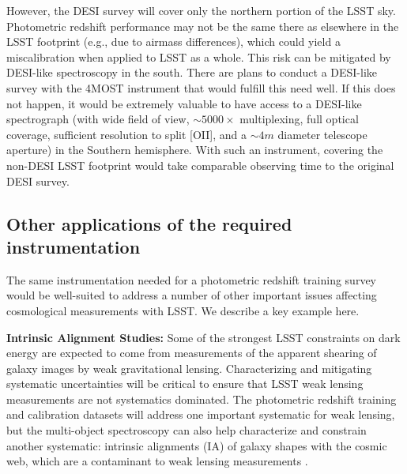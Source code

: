 However, the DESI survey will cover only the northern portion of the LSST sky.  Photometric redshift performance may not be the same there as elsewhere in the LSST footprint (e.g., due to airmass differences), which could yield a miscalibration when applied to LSST as a whole.  This risk can be mitigated by DESI-like spectroscopy in the south.  There are plans to conduct a DESI-like survey with the 4MOST instrument that would fulfill this need well.  If this does not happen, it would be extremely valuable to have access to a DESI-like spectrograph (with wide field of view, $\sim 5000\times$ multiplexing, full optical coverage, sufficient resolution to split [OII], and a $\sim 4m$ diameter telescope aperture) in the Southern hemisphere.  With such an instrument, covering the non-DESI LSST footprint would take comparable observing time to the original DESI survey.

\subsection{Other applications of the required instrumentation}

The same instrumentation needed for a photometric redshift training survey would be well-suited to address a number of other important issues  affecting cosmological measurements with LSST.  We describe a key example here.

{\bf Intrinsic Alignment Studies:} Some of the strongest LSST constraints on dark energy are
expected to come from measurements of the apparent shearing of galaxy images by weak gravitational
lensing.  Characterizing and mitigating systematic uncertainties will be critical to ensure that
LSST weak lensing measurements are not systematics dominated.  The photometric redshift training and
calibration datasets will address one important systematic for weak lensing, but the multi-object
spectroscopy can also help characterize and constrain another systematic: intrinsic alignments (IA)
of galaxy shapes with the cosmic web, which are a contaminant to weak lensing measurements \citep{2015SSRv..193....1J}.

